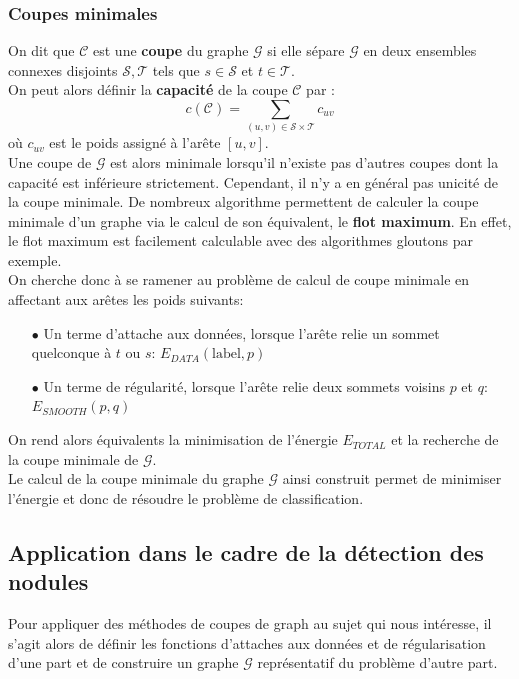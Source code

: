 \documentclass{article}
\newcommand{\lab}{\text{label}}
\begin{document}
\subsubsection{Coupes minimales}

On dit que $\mathcal{C}$ est une \textbf{coupe} du graphe $\mathcal{G}$ si elle sépare $\mathcal{G}$ en deux ensembles connexes disjoints $\mathcal{S},\mathcal{T}$ tels que  
$s \in \mathcal{S}$ et $t \in \mathcal{T}$.\\
On peut alors définir la \textbf{capacité} de la coupe $\mathcal{C}$ par :
\[
	c(\mathcal{C}) = \sum_{(u,v) \in \mathcal{S} \times \mathcal{T}} c_{uv}
\]
où $c_{uv}$ est le poids assigné à l'arête $[u,v]$.\\
Une coupe de $\mathcal{G}$ est alors minimale lorsqu'il n'existe pas d'autres coupes dont la capacité est inférieure strictement. Cependant, il n'y a en général pas unicité de la coupe minimale. De nombreux algorithme permettent de calculer la coupe minimale d'un graphe via le calcul de son équivalent, le \textbf{flot maximum}. En effet, le flot maximum est facilement calculable avec des algorithmes gloutons par exemple. \\
On cherche donc à se ramener au problème de calcul de coupe minimale en affectant aux arêtes les poids suivants:
\begin{itemize}
	\item[$\bullet$] Un terme d'attache aux données, lorsque l'arête relie un sommet quelconque à $t$ ou $s$: $E_{DATA}(\lab, p)$
	\item[$\bullet$] Un terme de régularité, lorsque l'arête relie deux sommets voisins $p$ et $q$: $E_{SMOOTH}(p,q)$
\end{itemize}
On rend alors équivalents la minimisation de l'énergie $E_{TOTAL}$ et la recherche de la coupe minimale de $\mathcal{G}$.\\
Le calcul de la coupe minimale du graphe $\mathcal{G}$ ainsi construit permet de minimiser l'énergie et donc de résoudre le problème de classification.

\subsection{Application dans le cadre de la détection des nodules}

Pour appliquer des méthodes de coupes de graph au sujet qui nous intéresse, il s'agit alors de définir les fonctions d'attaches aux données et de régularisation d'une part et de construire un graphe $\mathcal{G}$ représentatif du problème d'autre part.
\end{document}
